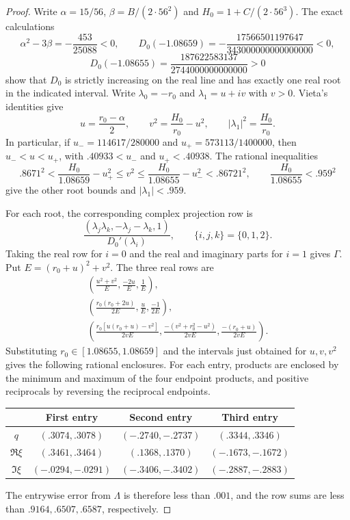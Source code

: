 \begin{proof}
Write $\alpha=15/56$, $\beta=B/(2\cdot56^2)$ and
$H_0=1+C/(2\cdot56^3)$.  The exact calculations
\[
 \alpha^2-3\beta=-\frac{453}{25088}<0,\qquad
 D_0(-1.08659)=-\frac{17566501197647}{343000000000000000}<0,
\]
\[
 D_0(-1.08655)=\frac{187622583137}{2744000000000000}>0
\]
show that $D_0$ is strictly increasing on the real line and has exactly
one real root in the indicated interval.  Write $\lambda_0=-r_0$ and
$\lambda_1=u+iv$ with $v>0$.  Vieta's identities give
\begin{equation}\label{prof:root-arithmetic}
 u=\frac{r_0-\alpha}{2},\qquad
 v^2=\frac{H_0}{r_0}-u^2,\qquad |\lambda_1|^2=\frac{H_0}{r_0}.
\end{equation}
In particular, if $u_-=114617/280000$ and $u_+=573113/1400000$, then
$u_-<u<u_+$, with $.40933<u_-$ and $u_+<.40938$.  The rational inequalities
\[
 .8671^2<\frac{H_0}{1.08659}-u_+^2
 \le v^2\le\frac{H_0}{1.08655}-u_-^2<.86721^2,
 \qquad \frac{H_0}{1.08655}<.959^2
\]
give the other root bounds and $|\lambda_1|<.959$.

For each root, the corresponding complex projection row is
\begin{equation}\label{prof:projection-row}
 \frac{(\lambda_j\lambda_k,-\lambda_j-\lambda_k,1)}
 {D_0'(\lambda_i)},\qquad \{i,j,k\}=\{0,1,2\}.
\end{equation}
Taking the real row for $i=0$ and the real and imaginary parts for $i=1$
gives $\Gamma$.  Put $E=(r_0+u)^2+v^2$.  The three real rows are
\[
 \begin{gathered}
 \left(\frac{u^2+v^2}{E},\frac{-2u}{E},\frac1E\right),\\
 \left(\frac{r_0(r_0+2u)}{2E},\frac uE,\frac{-1}{2E}\right),\\
 \left(\frac{r_0[u(r_0+u)-v^2]}{2vE},
       \frac{-(v^2+r_0^2-u^2)}{2vE},\frac{-(r_0+u)}{2vE}\right).
 \end{gathered}
\]
Substituting $r_0\in[1.08655,1.08659]$ and the intervals just obtained
for $u,v,v^2$ gives the following rational enclosures.  For each entry,
products are enclosed by the minimum and maximum of the four endpoint
products, and positive reciprocals by reversing the reciprocal endpoints.
\begin{center}
\begin{tabular}{c c c c}
\toprule
 & First entry & Second entry & Third entry\\
\midrule
$q$ & $(.3074,.3078)$ & $(-.2740,-.2737)$ & $(.3344,.3346)$\\
$\Re\xi$ & $(.3461,.3464)$ & $(.1368,.1370)$ & $(-.1673,-.1672)$\\
$\Im\xi$ & $(-.0294,-.0291)$ & $(-.3406,-.3402)$ & $(-.2887,-.2883)$\\
\bottomrule
\end{tabular}
\end{center}
The entrywise error from $\Lambda$ is therefore less than $.001$, and
the row sums are less than $.9164,.6507,.6587$, respectively.


\end{proof}
